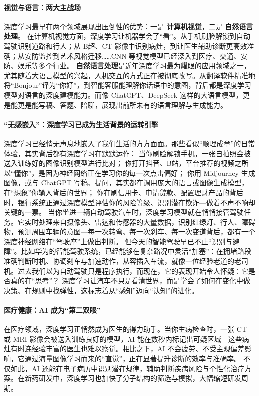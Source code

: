 \paragraph{视觉与语言：两大主战场}
深度学习最早在两个领域展现出压倒性的优势：一是 {\bf 计算机视觉}，二是 {\bf 自然语言处理}。
在计算机视觉方面，深度学习让机器学会了“看”。从手机刷脸解锁到自动驾驶识别道路和行人；从 B超、CT 影像中识别病灶，到让医生辅助诊断更高效准确；从安防监控到艺术风格迁移……CNN 等视觉模型已经深入到医疗、交通、安防、娱乐等多个行业。
 {\bf 自然语言处理}是近年深度学习最为耀眼的应用领域之一，尤其随着大语言模型的兴起，人机交互的方式正在被彻底改写。从翻译软件精准地将“Bonjour”译为“你好”，到智能客服能理解你话语中的意图，背后都是深度学习模型对语言的深度建模能力。而像 ChatGPT、DeepSeek 这样的大语言模型，更是能更是能写稿、答题、陪聊，展现出前所未有的语言理解与生成能力。
 \paragraph{“无感嵌入”：深度学习已成为生活背景的运转引擎}
深度学习已经悄无声息地嵌入了我们生活的方方面面。那些看似“顺理成章”的日常体验，其实背后都有深度学习在默默运作：
当你刷脸解锁手机，一张自拍照会被送入训练好的图像识别模型进行比对；
你打开抖音、B站，平台推荐的视频之所以“懂你”，是因为神经网络正在学习你的每一次点击偏好；
你用 Midjourney 生成图像，或与 ChatGPT 写稿、提问，其实都在调用庞大的语言或图像生成模型，在“想象”你输入背后的世界；
你在刷信用卡、申请贷款、配置理财产品的背后时，银行系统正通过深度模型评估你的风险等级、识别潜在欺诈---做着不声不响却关键的一票。
当你坐进一辆自动驾驶汽车时，深度学习模型就在悄悄接管驾驶任务。它实时处理来自摄像头、雷达和传感器的大量数据，识别红绿灯、行人、障碍物，预测周围车辆的意图---每一次转弯、每一次刹车、每一次变道背后，都有一个深度神经网络在“驾驶座”上做出判断。
但今天的智能驾驶早已不止“识别与避障”。比如华为的智能驾驶系统，已经能够在复杂路况中灵活“加塞”：在拥堵路段准确判断时机、协调刹车与加速动作，从容插入车流，就像一位经验老道的老司机。过去我们以为自动驾驶只是程序执行，而现在，它的表现开始令人怀疑：它是否真的在“思考”？
深度学习让汽车不只是看清世界，而是学会了如何在变化中做决策、在规则中找弹性，这标志着从“感知”迈向“认知”的进化。
\paragraph{医疗健康：AI 成为“第二双眼”}
在医疗领域，深度学习正悄然成为医生的得力助手。当你生病检查时，一张 CT 或 MRI 影像会被送入训练良好的模型，AI 能在数秒内标记出可疑区域---这些病灶有时连经验丰富的医生也难以察觉。相比之下，AI 不会疲劳、不受主观偏差影响，它通过海量图像学习而来的“直觉”，正在显著提升诊断的效率与准确率。
不仅如此，AI 还能在电子病历中识别潜在规律，辅助判断疾病风险与个性化治疗方案。在新药研发中，深度学习也加快了分子结构的筛选与模拟，大幅缩短研发周期。
